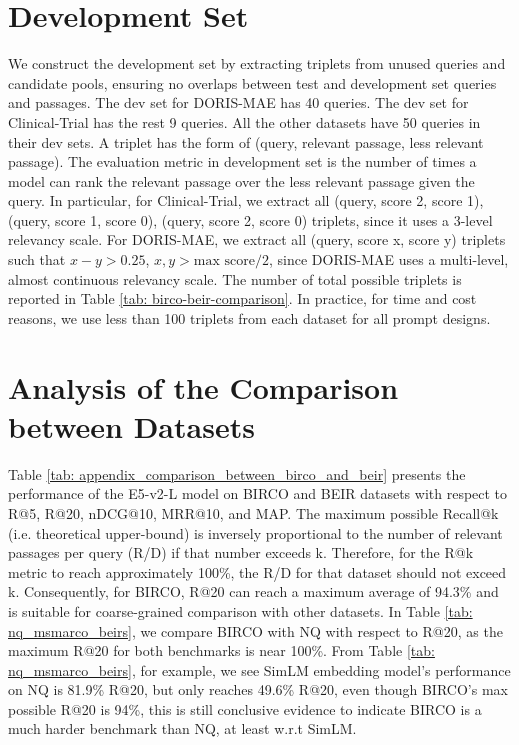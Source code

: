 \documentclass[11pt]{article}
\begin{document}
\section{Development Set}
\label{sec: appendix_dev_set}
We construct the development set by extracting triplets from unused queries and candidate pools, ensuring no overlaps between test and development set queries and passages. The dev set for DORIS-MAE has 40 queries. The dev set for Clinical-Trial has the rest 9 queries. All the other datasets have 50 queries in their dev sets. A triplet has the form of (query, relevant passage, less relevant passage). The evaluation metric in development set is the number of times a model can rank the relevant passage over the less relevant passage given the query. In particular, for Clinical-Trial, we extract all (query, score 2, score 1), (query, score 1, score 0), (query, score 2, score 0) triplets, since it uses a 3-level relevancy scale. For DORIS-MAE, we extract all (query, score x, score y) triplets such that $x-y> 0.25$, $x, y> \textrm{max score}/2$, since DORIS-MAE uses a multi-level, almost continuous relevancy scale. The number of total possible triplets is reported in Table \ref{tab: birco-beir-comparison}. In practice, for time and cost reasons, we use less than 100 triplets from each dataset for all prompt designs. 


\section{Analysis of the Comparison between Datasets}
\label{sec: appendix_analysis of the comparison between birco and other datasets}
Table \ref{tab: appendix_comparison_between_birco_and_beir} presents the performance of the E5-v2-L model on BIRCO and BEIR datasets with respect to R@5, R@20, nDCG@10, MRR@10, and MAP. The maximum possible Recall@k (i.e. theoretical upper-bound) is inversely proportional to the number of relevant passages per query (R/D) if that number exceeds k. Therefore, for the R@k metric to reach approximately 100\%, the R/D for that dataset should not exceed k. Consequently, for BIRCO, R@20 can reach a maximum average of 94.3\% and is suitable for coarse-grained comparison with other datasets. In Table \ref{tab: nq_msmarco_beirs}, we compare BIRCO with NQ with respect to R@20, as the maximum R@20 for both benchmarks is near 100\%. From Table \ref{tab: nq_msmarco_beirs}, for example, we see SimLM embedding model's performance on NQ is 81.9\% R@20, but only reaches 49.6\% R@20, even though BIRCO's max possible R@20 is 94\%, this is still conclusive evidence to indicate BIRCO is a much harder benchmark than NQ, at least w.r.t SimLM. 
\end{document}
